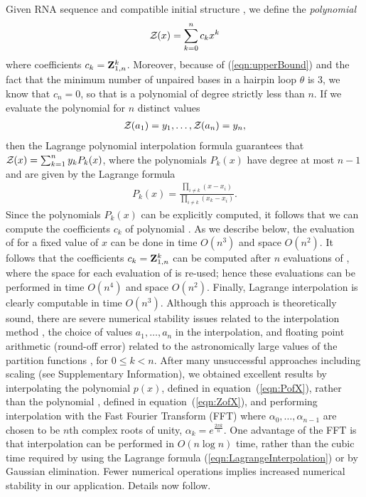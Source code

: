 Given RNA sequence \seq and compatible initial structure \strSt,
we define the {\em polynomial}
\begin{eqnarray}
\label{eqn:polynomialYann}
\emZ{} = \sum_{k=0}^n c_k x^k
\end{eqnarray}
where coefficients $c_k={\bf Z}^{k}_{1,n}$. Moreover, because of
(\ref{eqn:upperBound}) and the fact that the minimum number of
unpaired bases in a hairpin loop $\theta$ is $3$, we know that $c_n=0$,
so that \emZ{} is a polynomial of degree strictly less than $n$.
If we evaluate the polynomial \emZ{} for $n$ distinct values
\begin{eqnarray}
\label{eqn:ZofX}
\emZof{}{a_1} = y_1,\ldots, \emZof{}{a_n} = y_n,
\end{eqnarray}
then the Lagrange polynomial interpolation formula guarantees that
${\mathcal Z}_{}(x) = \sum_{k=1}^n y_k P_k(x)$, where the polynomials $P_k(x)$ have degree
at most $n-1$ and are given by the Lagrange formula
\begin{eqnarray}
\label{eqn:LagrangeInterpolation}
P_k(x) = \frac{\prod_{i\ne k} (x-x_i)}{\prod_{i \ne k} (x_k-x_i)}.
\end{eqnarray}
Since the polynomials $P_k(x)$ can be explicitly computed, it follows that
we can compute the coefficients $c_k$ of polynomial \emZ{}. As we describe
below, the evaluation of \emZ{} for a fixed value of $x$ can be done in
time $O(n^3)$ and space $O(n^2)$.  It follows that the coefficients
$c_k={\bf Z}^{k}_{1,n}$ can be computed after
$n$ evaluations of \emZ{}, where the space for each evaluation of \emZ{}
is re-used; hence these evaluations can be performed in time $O(n^4)$ and space
$O(n^2)$. Finally,
Lagrange interpolation is clearly computable in time $O(n^3)$.
Although this approach is theoretically sound, there are severe
numerical stability issues related to the interpolation method
\cite{HighamBarycentricInterpolation},
the choice of values $a_1,\ldots,a_{n}$ in the interpolation,
and floating point arithmetic (round-off error) related to the
astronomically large values of the partition functions
, for $0 \leq k < n$. After many unsuccessful
approaches including scaling (see Supplementary Information),
we obtained excellent results by
interpolating the polynomial $p(x)$, defined in equation~(\ref{eqn:PofX}),
rather than the polynomial \emZ{}, defined in equation~(\ref{eqn:ZofX}),
and performing interpolation with the Fast Fourier Transform (FFT) \cite{cormen}
where $\alpha_0,\ldots,\alpha_{n-1}$ are
chosen to be $n$th complex roots of unity,
$\alpha_k = e^{\frac{2 \pi k}{n}}$.
One
advantage of the FFT is that interpolation can be performed in $O(n \log n)$
time, rather than the cubic time required by using the Lagrange formula
(\ref{eqn:LagrangeInterpolation}) or by Gaussian elimination. Fewer
numerical operations implies increased numerical stability in our application.
Details now follow.

